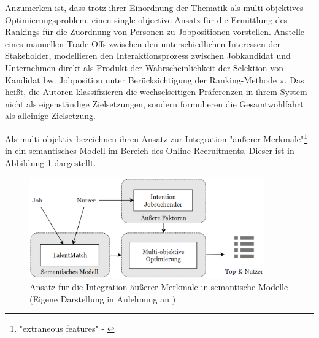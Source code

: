 Anzumerken ist, dass \textcite[S. 328ff.]{su:inproceedings} trotz ihrer Einordnung der Thematik als multi-objektives Optimierungsproblem, einen single-objective Ansatz für die Ermittlung des Rankings für die Zuordnung von Personen zu Jobpositionen vorstellen.
Anstelle eines manuellen Trade-Offs zwischen den unterschiedlichen Interessen der Stakeholder, modellieren \textcite[S. 329]{su:inproceedings} den Interaktionsprozess zwischen Jobkandidat und Unternehmen direkt als Produkt der Wahrscheinlichkeit der Selektion von Kandidat bw. Jobposition unter Berücksichtigung der Ranking-Methode $\pi$.
Das heißt, die Autoren klassifizieren die wechselseitigen Präferenzen in ihrem System nicht als eigenständige Zielsetzungen, sondern formulieren die Gesamtwohlfahrt als alleinige Zielsetzung.


Als multi-objektiv bezeichnen \textcite[S. 12]{rodriguez:inproceedings} ihren Ansatz zur Integration "äußerer Merkmale"\footnote{"extraneous features" - \textcite[S. 12]{rodriguez:inproceedings}} in ein semantisches Modell im Bereich des Online-Recruitments. 
Dieser ist in Abbildung \ref{fig:relatedwork:abb1} dargestellt.

\begin{figure}
    \centering
	\includegraphics[width=0.9\textwidth]{gfx/talentMatch.png}
	\caption[Ansatz für die Integration äußerer Merkmale in semantische Modelle]{Ansatz für die Integration äußerer Merkmale in semantische Modelle\\
    (Eigene Darstellung in Anlehnung an \cite[S. 12]{rodriguez:inproceedings})}
	\label{fig:relatedwork:abb1}
\end{figure}

